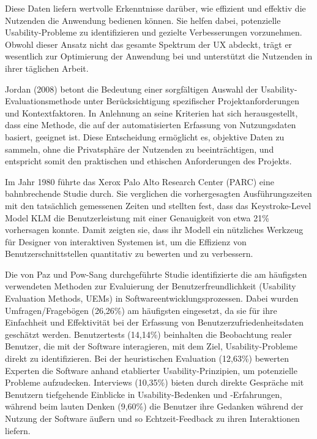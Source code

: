 \documentclass[12pt,oneside]{article}
\begin{document}
Diese Daten liefern wertvolle Erkenntnisse darüber, wie effizient und effektiv die Nutzenden die Anwendung bedienen können. Sie helfen dabei, potenzielle Usability-Probleme zu identifizieren und gezielte Verbesserungen vorzunehmen. Obwohl dieser Ansatz nicht das gesamte Spektrum der UX abdeckt, trägt er wesentlich zur Optimierung der Anwendung bei und unterstützt die Nutzenden in ihrer täglichen Arbeit.

Jordan (2008)\cite{jordan2008auswahl} betont die Bedeutung einer sorgfältigen Auswahl der Usability-Evaluationsmethode unter Berücksichtigung spezifischer Projektanforderungen und Kontextfaktoren. In Anlehnung an seine Kriterien hat sich herausgestellt, dass eine Methode, die auf der automatisierten Erfassung von Nutzungsdaten basiert, geeignet ist. Diese Entscheidung ermöglicht es, objektive Daten zu sammeln, ohne die Privatsphäre der Nutzenden zu beeinträchtigen, und entspricht somit den praktischen und ethischen Anforderungen des Projekts.

Im Jahr 1980 führte das Xerox Palo Alto Research Center (PARC)\cite{keystroke} eine bahnbrechende Studie durch. Sie verglichen die vorhergesagten Ausführungszeiten mit den tatsächlich gemessenen Zeiten und stellten fest, dass das Keystroke-Level Model  KLM die Benutzerleistung mit einer Genauigkeit von etwa 21\% vorhersagen konnte. Damit zeigten sie, dass ihr Modell ein nützliches Werkzeug für Designer von interaktiven Systemen ist, um die Effizienz von Benutzerschnittstellen quantitativ zu bewerten und zu verbessern.


Die von Paz und Pow-Sang durchgeführte Studie \cite{Paz2016} identifizierte die am häufigsten verwendeten Methoden zur Evaluierung der Benutzerfreundlichkeit (Usability Evaluation Methods, UEMs) in Softwareentwicklungsprozessen. Dabei wurden Umfragen/Fragebögen (26,26\%) am häufigsten eingesetzt, da sie für ihre Einfachheit und Effektivität bei der Erfassung von Benutzerzufriedenheitsdaten geschätzt werden. Benutzertests (14,14\%) beinhalten die Beobachtung realer Benutzer, die mit der Software interagieren, mit dem Ziel, Usability-Probleme direkt zu identifizieren. Bei der heuristischen Evaluation (12,63\%) bewerten Experten die Software anhand etablierter Usability-Prinzipien, um potenzielle Probleme aufzudecken. Interviews (10,35\%) bieten durch direkte Gespräche mit Benutzern tiefgehende Einblicke in Usability-Bedenken und -Erfahrungen, während beim lauten Denken (9,60\%) die Benutzer ihre Gedanken während der Nutzung der Software äußern und so Echtzeit-Feedback zu ihren Interaktionen liefern.
\end{document}
